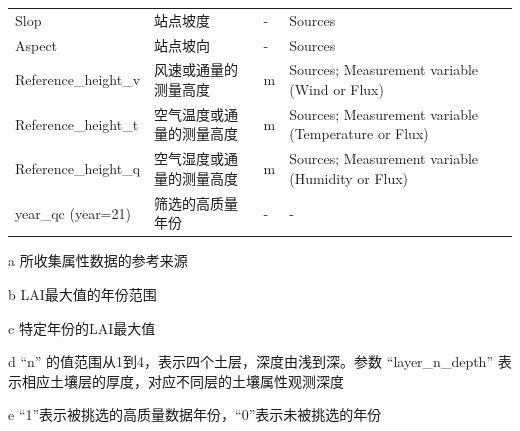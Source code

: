 \begin{table}[htbp]
\begin{threeparttable}
\begin{tabular}{p{9.75em}p{10.25em}p{3.5em}p{9.5em}}
      Slop                                                 & 站点坡度                  & -              & Sources                                                      \\
      Aspect                                               & 站点坡向                  & -              & Sources                                                      \\
      Reference\_height\_v                                 & 风速或通量的测量高度      & m              & Sources; Measurement variable (Wind or Flux)                 \\
      Reference\_height\_t                                 & 空气温度或通量的测量高度  & m              & Sources; Measurement variable (Temperature or Flux)          \\
      Reference\_height\_q                                 & 空气湿度或通量的测量高度  & m              & Sources; Measurement variable (Humidity or Flux)             \\
      year\_qc (year=21)                                   & 筛选的高质量年份\tnote{e} & -              & -                                                            \\
      \bottomrule
    \end{tabular}
    \begin{tablenotes}
    \item [a] 所收集属性数据的参考来源
    \item [b] LAI最大值的年份范围
    \item [c] 特定年份的LAI最大值
    \item [d] ``n'' 的值范围从1到4，表示四个土层，深度由浅到深。参数
      ``layer\_n\_depth'' 表示相应土壤层的厚度，对应不同层的土壤属性观测深度
    \item [e] ``1''表示被挑选的高质量数据年份，``0''表示未被挑选的年份
    \end{tablenotes}
  \end{threeparttable}
\end{table}

